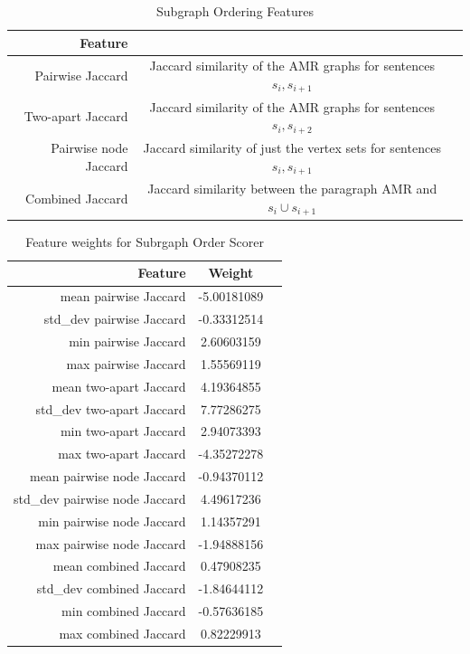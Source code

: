\documentclass[12pt]{article}
\begin{document}
\begin{table}
\centering
\begin{tabular}{|r|c|c|}
\hline
Feature & \\ \hline\hline
Pairwise Jaccard & Jaccard similarity of the AMR graphs for sentences $s_i,s_{i+1}$ \\ \hline
Two-apart Jaccard & Jaccard similarity of the AMR graphs for sentences $s_i,s_{i+2}$ \\ \hline
Pairwise node Jaccard & Jaccard similarity of just the vertex sets for sentences $s_i,s_{i+1}$ \\ \hline
Combined Jaccard & Jaccard similarity between the paragraph AMR and $s_i \cup
s_{i+1}$ \\ \hline
\end{tabular}
\caption{Subgraph Ordering Features}
\end{table}

\begin{table}
\centering
\begin{tabular}{|r|c|c|}
\hline
Feature & Weight \\ \hline\hline
mean pairwise Jaccard & -5.00181089 \\ \hline
std\_dev pairwise Jaccard & -0.33312514 \\ \hline
min pairwise Jaccard & 2.60603159 \\ \hline
max pairwise Jaccard & 1.55569119 \\ \hline
mean two-apart Jaccard & 4.19364855 \\ \hline
std\_dev two-apart Jaccard & 7.77286275 \\ \hline
min two-apart Jaccard & 2.94073393 \\ \hline
max two-apart Jaccard & -4.35272278 \\ \hline
mean pairwise node Jaccard & -0.94370112 \\ \hline
std\_dev pairwise node Jaccard & 4.49617236 \\ \hline
min pairwise node Jaccard & 1.14357291 \\ \hline
max pairwise node Jaccard & -1.94888156 \\ \hline
mean combined Jaccard & 0.47908235 \\ \hline
std\_dev combined Jaccard & -1.84644112 \\ \hline
min combined Jaccard & -0.57636185 \\ \hline
max combined Jaccard & 0.82229913 \\ \hline
\end{tabular}
\caption{Feature weights for Subrgaph Order Scorer}
\end{table}
\end{document}
